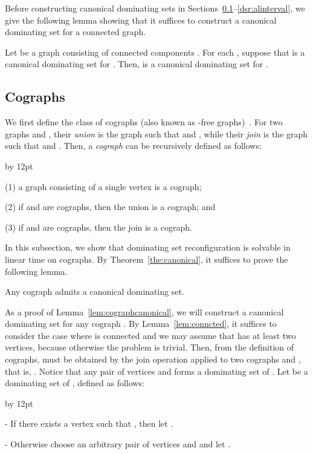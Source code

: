 \documentclass{llncs}
\newenvironment{listing}[1]{\begin{list}{*}{\settowidth{\labelwidth}{#1}\setlength{\leftmargin}{\labelwidth}\advance \leftmargin by 12pt
\setlength{\itemsep}{0pt}\setlength{\parsep}{0pt}\setlength{\topsep}{0pt}\setlength{\parskip}{0pt}}}{\end{list}}
\begin{document}
Before constructing canonical dominating sets in
Sections~\ref{dsr:cograph}--\ref{dsr:alinterval}, we give the following lemma showing that
it suffices to construct a canonical dominating set for a connected graph.

\begin{lemma}[*]\label{lem:conncted}
Let  be a graph consisting of  connected components .
For each , suppose that  is a canonical dominating set for .
Then,  is a canonical dominating set for .
\end{lemma}

\subsection{Cographs} \label{dsr:cograph}
	
We first define the class of cographs (also known as -free graphs)~\cite{BLS99}.
For two graphs  and , their {\em union } is the graph such
that  and , while
their {\em join } is the graph such that 
and .
Then, a {\em cograph} can be recursively defined as follows:
\begin{listing}{aaa}
	\item[{\rm (1)}] a graph consisting of a single vertex is a cograph;
	\item[{\rm (2)}] if  and  are cographs, then the union  is a cograph; and
	\item[{\rm (3)}] if  and  are cographs, then the join  is a cograph.
\end{listing}

In this subsection, we show that {\sc dominating set reconfiguration} is solvable in linear time on cographs.
By Theorem~\ref{the:canonical}, it suffices to prove the following lemma.
\begin{lemma} \label{lem:cographcanonical}
Any cograph admits a canonical dominating set.
\end{lemma}

As a proof of Lemma~\ref{lem:cographcanonical}, we will construct a canonical dominating set for any cograph .
By Lemma~\ref{lem:conncted}, it suffices to consider the case where  is
connected and we may assume that  has at least two vertices, because otherwise the problem is trivial.
Then, from the definition of cographs,  must be obtained by the join
operation applied to two cographs  and , that is, .
Notice that any pair  of vertices  and  forms a dominating set of .
Let  be a dominating set of , defined as follows:

\begin{listing}{a}
	\item[-] If there exists a vertex  such that , then let .
	\item[-] Otherwise choose an arbitrary pair of vertices 
    and  and let .
\end{listing}
\end{document}
